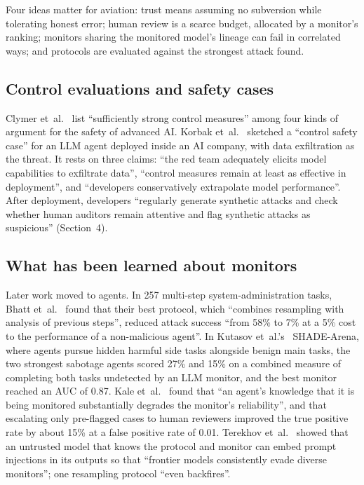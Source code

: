 \documentclass[11pt]{article}
\begin{document}
Four ideas matter for aviation: trust means assuming no subversion while tolerating honest error; human review is a scarce budget, allocated by a monitor's ranking; monitors sharing the monitored model's lineage can fail in correlated ways; and protocols are evaluated against the strongest attack found.

\subsection{Control evaluations and safety cases}\label{sec:safetycases}

Clymer et~al.~\cite{clymer2024safety} list ``sufficiently strong control measures'' among four kinds of argument for the safety of advanced AI. Korbak et~al.~\cite{korbak2025sketch} sketched a ``control safety case'' for an LLM agent deployed inside an AI company, with data exfiltration as the threat. It rests on three claims: ``the red team adequately elicits model capabilities to exfiltrate data'', ``control measures remain at least as effective in deployment'', and ``developers conservatively extrapolate model performance''. After deployment, developers ``regularly generate synthetic attacks and check whether human auditors remain attentive and flag synthetic attacks as suspicious'' (Section~4).

\subsection{What has been learned about monitors}\label{sec:monitors}

Later work moved to agents. In 257 multi-step system-administration tasks, Bhatt et~al.~\cite{bhatt2025ctrlz} found that their best protocol, which ``combines resampling with analysis of previous steps'', reduced attack success ``from 58\% to 7\% at a 5\% cost to the performance of a non-malicious agent''. In Kutasov et~al.'s~\cite{kutasov2025shade} SHADE-Arena, where agents pursue hidden harmful side tasks alongside benign main tasks, the two strongest sabotage agents scored 27\% and 15\% on a combined measure of completing both tasks undetected by an LLM monitor, and the best monitor reached an AUC of 0.87. Kale et~al.~\cite{kale2025monitoring} found that ``an agent's knowledge that it is being monitored substantially degrades the monitor's reliability'', and that escalating only pre-flagged cases to human reviewers improved the true positive rate by about 15\% at a false positive rate of 0.01. Terekhov et~al.~\cite{terekhov2025adaptive} showed that an untrusted model that knows the protocol and monitor can embed prompt injections in its outputs so that ``frontier models consistently evade diverse monitors''; one resampling protocol ``even backfires''.
\end{document}
